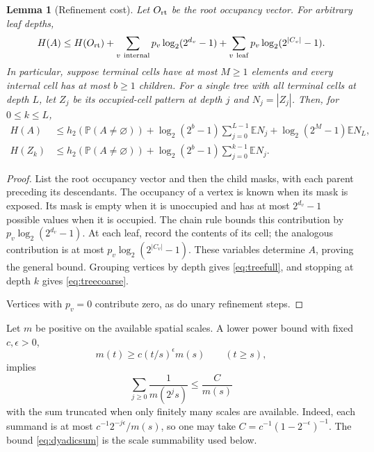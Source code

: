 \documentclass[11pt]{amsart}
\newtheorem{lemma}[theorem]{Lemma}
\theoremstyle{remark}
\newcommand{\Prob}{\mathbb P}
\newcommand{\E}{\mathbb E}
\begin{document}
\begin{lemma}[Refinement cost]\label{cor:forestcost}
Let $O_{\rm rt}$ be the root occupancy vector. For arbitrary leaf depths,
\[
 H(A)\le H(O_{\rm rt})
 +\sum_{v\ \mathrm{internal}}p_v\log_2(2^{d_v}-1)
 +\sum_{v\ \mathrm{leaf}}p_v\log_2(2^{|C_v|}-1).
\]
In particular, suppose terminal cells have at most $M\ge1$ elements and
every internal cell has at most $b\ge1$ children. For a single tree with
all terminal cells at depth $L$, let $Z_j$ be its occupied-cell pattern
at depth $j$ and $N_j=|Z_j|$. Then, for $0\le k\le L$,
\begin{align}
 H(A)&\le h_2(\Prob(A\ne\varnothing))
 +\log_2(2^b-1)\sum_{j=0}^{L-1}\E N_j
 +\log_2(2^M-1)\E N_L,\label{eq:treefull}\\
 H(Z_k)&\le h_2(\Prob(A\ne\varnothing))
 +\log_2(2^b-1)\sum_{j=0}^{k-1}\E N_j.\label{eq:treecoarse}
\end{align}
\end{lemma}
\begin{proof}
List the root occupancy vector and then the child masks, with each
parent preceding its descendants. The occupancy of a vertex is known
when its mask is exposed. Its mask is empty when it is unoccupied and
has at most $2^{d_v}-1$ possible values when it is occupied. The chain
rule bounds this contribution by $p_v\log_2(2^{d_v}-1)$. At each leaf,
record the contents of its cell; the analogous contribution is at most
$p_v\log_2(2^{|C_v|}-1)$. These variables determine $A$, proving the
general bound. Grouping vertices by depth gives \eqref{eq:treefull},
and stopping at depth $k$ gives \eqref{eq:treecoarse}.

Vertices with $p_v=0$ contribute zero, as do unary refinement steps.
\end{proof}

Let $m$ be positive on the available spatial scales. A lower power bound
with fixed $c,\epsilon>0$,
\begin{equation}\label{eq:massgrowth}
 m(t)\ge c(t/s)^\epsilon m(s)\qquad(t\ge s),
\end{equation}
implies
\begin{equation}\label{eq:dyadicsum}
 \sum_{j\ge0}\frac1{m(2^js)}\le\frac{C}{m(s)}
\end{equation}
with the sum truncated when only finitely many scales are available.
Indeed, each summand is at most $c^{-1}2^{-j\epsilon}/m(s)$, so one may
take $C=c^{-1}(1-2^{-\epsilon})^{-1}$.
The bound \eqref{eq:dyadicsum} is the scale summability used below.
\end{document}
